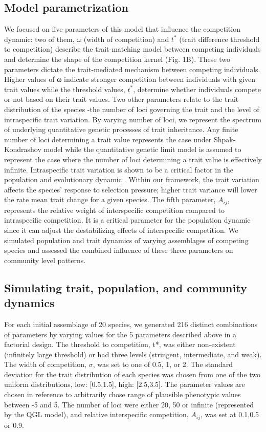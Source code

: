 \documentclass[12pt]{article}
\begin{document}
\subsection{Model parametrization}
We focused on five parameters of this model that influence the competition dynamic: two of them, $\omega$ (width of competition) and $t^{*}$ (trait difference threshold to competition) describe the trait-matching model between competing individuals and determine the shape of the competition kernel (Fig. 1B). These two parameters dictate the trait-mediated mechanism between competing individuals. Higher values of ω indicate stronger competition between individuals with given trait values while the threshold values, $t^{*}$, determine whether individuals compete or not based on their trait values. Two other parameters relate to the trait distribution of the species -the number of loci governing the trait and the level of intraspecific trait variation. By varying number of loci, we represent the spectrum of underlying quantitative genetic processes of trait inheritance. Any finite number of loci determining a trait value represents the case under Shpak-Kondrashov model while the quantitative genetic limit model is assumed to represent the case where the number of loci determining a trait value is effectively infinite. Intraspecific trait variation is shown to be a critical factor in the population and evolutionary dynamic \cite{bolnick2011intraspecific,barabas2016effect}. Within our framework, the trait variation affects the species’ response to selection pressure; higher trait variance will lower the rate mean trait change for a given species. The fifth parameter, $A_{ij}$, represents the relative weight of interspecific competition compared to intraspecific competition. It is a critical parameter for the population dynamic since it can adjust the destabilizing effects of interspecific competition. We simulated population and trait dynamics of varying assemblages of competing species and assessed the combined influence of these three parameters on community level patterns.

\subsection{Simulating trait, population, and community dynamics}
For each initial assemblage of 20 species, we generated 216 distinct combinations of parameters by varying values for the 5 parameters described above in a factorial design. The threshold to competition, t*, was either non-existent (infinitely large threshold) or had three levels (stringent, intermediate, and weak). The width of competition, $\sigma$, was set to one of 0.5, 1, or 2. The standard deviation for the trait distribution of each species was chosen from one of the two uniform distributions, low: [0.5,1.5], high: [2.5,3.5]. The parameter values are chosen in reference to arbitrarily chose range of plausible phenotypic values between -5 and 5. The number of loci were either 20, 50 or infinite (represented by the QGL model), and relative interspecific competition, $A_{ij}$, was set at 0.1,0.5 or 0.9. 
\end{document}
